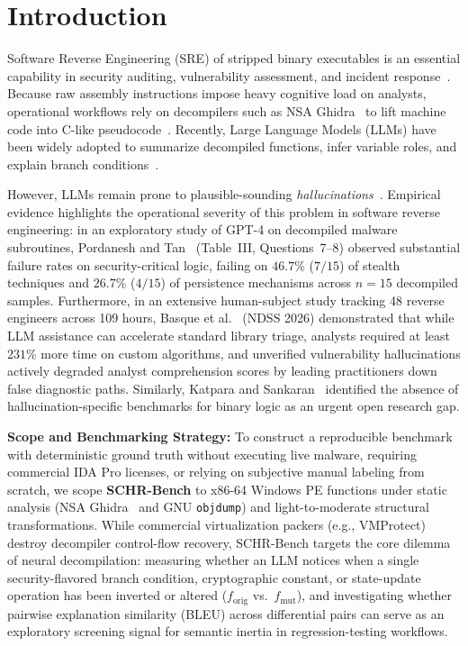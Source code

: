 \documentclass[runningheads]{llncs}
\begin{document}
\section{Introduction}
Software Reverse Engineering (SRE) of stripped binary executables is an essential capability in security auditing, vulnerability assessment, and incident response~\cite{shoshitaishvili2016sok,cifuentes1995decompilation}. Because raw assembly instructions impose heavy cognitive load on analysts, operational workflows rely on decompilers such as NSA Ghidra~\cite{ghidra2024nsa} to lift machine code into C-like pseudocode~\cite{yakdan2015norepdb}. Recently, Large Language Models (LLMs) have been widely adopted to summarize decompiled functions, infer variable roles, and explain branch conditions~\cite{pordanesh2024exploring,basque2026decompiling,tan2024llm4decompile,hui2024qwen25coder,dubey2024llama3}.

However, LLMs remain prone to plausible-sounding \textit{hallucinations}~\cite{ji2023hallucination,min2023factscore}. Empirical evidence highlights the operational severity of this problem in software reverse engineering: in an exploratory study of GPT-4 on decompiled malware subroutines, Pordanesh and Tan~\cite{pordanesh2024exploring} (Table~III, Questions~7--8) observed substantial failure rates on security-critical logic, failing on $46.7\%$ ($7/15$) of stealth techniques and $26.7\%$ ($4/15$) of persistence mechanisms across $n=15$ decompiled samples. Furthermore, in an extensive human-subject study tracking 48 reverse engineers across 109 hours, Basque et al.~\cite{basque2026decompiling} (NDSS 2026) demonstrated that while LLM assistance can accelerate standard library triage, analysts required at least $231\%$ more time on custom algorithms, and unverified vulnerability hallucinations actively degraded analyst comprehension scores by leading practitioners down false diagnostic paths. Similarly, Katpara and Sankaran~\cite{katpara2026firmware} identified the absence of hallucination-specific benchmarks for binary logic as an urgent open research gap.

\textbf{Scope and Benchmarking Strategy:} To construct a reproducible benchmark with deterministic ground truth without executing live malware, requiring commercial IDA Pro licenses, or relying on subjective manual labeling from scratch, we scope \textbf{SCHR-Bench} to x86-64 Windows PE functions under static analysis (NSA Ghidra~\cite{ghidra2024nsa} and GNU \texttt{objdump}) and light-to-moderate structural transformations. While commercial virtualization packers (e.g., VMProtect) destroy decompiler control-flow recovery, SCHR-Bench targets the core dilemma of neural decompilation: measuring whether an LLM notices when a single security-flavored branch condition, cryptographic constant, or state-update operation has been inverted or altered ($f_{\text{orig}}$ vs.\ $f_{\text{mut}}$), and investigating whether pairwise explanation similarity (BLEU) across differential pairs can serve as an exploratory screening signal for semantic inertia in regression-testing workflows.
\end{document}
